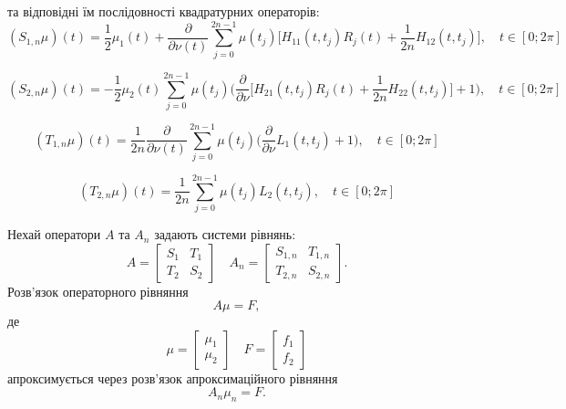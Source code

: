 \documentclass[10pt]{beamer}
\begin{document}
\begin{frame}
та відповідні їм послідовності квадратурних операторів:
\begin{equation*}
(S_{1,n}\mu)(t)=\frac{1}{2}\mu_1(t)+\frac{\partial}{\partial\nu(t)}\sum\limits_{j=0}^{2n-1} \mu(t_{j})\Big[H_{11}(t,t_j)R_j(t)+\frac{1}{2n}H_{12}(t,t_j)\Big], \quad t\in[0;2\pi]
\end{equation*}

\begin{equation*}
(S_{2,n}\mu)(t)=-\frac{1}{2}\mu_2(t)\sum\limits_{j=0}^{2n-1} \mu(t_{j})\bigg(\frac{\partial}{\partial\nu}\Big[H_{21}(t,t_j)R_j(t)+\frac{1}{2n}H_{22}(t,t_j)\Big] + 1\bigg), \quad t\in[0;2\pi]
\end{equation*}

\begin{equation*}
(T_{1,n}\mu)(t)=\frac{1}{2n}\frac{\partial}{\partial\nu(t)}\sum\limits_{j=0}^{2n-1}\mu(t_j)\bigg(\frac{\partial}{\partial\nu}L_{1}(t,t_j) + 1\bigg), \quad t\in[0;2\pi]
\end{equation*}

\begin{equation*}
(T_{2,n}\mu)(t)=\frac{1}{2n}\sum\limits_{j=0}^{2n-1}\mu(t_j)L_{2}(t,t_j), \quad t\in[0;2\pi]
\end{equation*}
\end{frame}

\begin{frame}
Нехай оператори $A$ та $A_{n}$ задають системи рівнянь:
\begin{equation*}
A=\left[
\begin{array}{cc}
S_{1}&T_{1}\\
T_{2}&S_{2}
\end{array}
\right]\quad
A_{n}=\left[
\begin{array}{cc}
S_{1,n}&T_{1,n}\\
T_{2,n}&S_{2,n}
\end{array}
\right].
\end{equation*}
\hspace*{\parindent}Розв'язок операторного рівняння
\begin{equation*}
A\mu=F,
\end{equation*}
де 
\begin{equation*}
\mu=\left[
\begin{array}{c}
\mu_{1}\\
\mu_{2}
\end{array}
\right]\quad
F=\left[
\begin{array}{c}
f_{1}\\
f_{2}
\end{array}
\right]
\end{equation*}
апроксимується через розв'язок апроксимаційного рівняння
\begin{equation*}
A_{n}\mu_{n}=F.
\end{equation*}
\end{frame}
\end{document}
